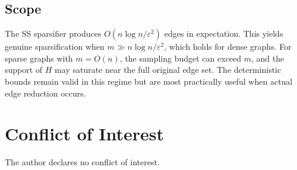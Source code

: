 \documentclass[11pt]{article}
\theoremstyle{definition}
\newcommand{\eps}{\varepsilon}
\begin{document}
\subsection{Scope}

The SS sparsifier produces $O(n\log n/\eps^2)$ edges in expectation. This yields
genuine sparsification when $m \gg n\log n/\eps^2$, which holds for dense graphs.
For sparse graphs with $m = O(n)$, the sampling budget can
exceed $m$, and the support of $H$ may saturate near the full original edge set.
The deterministic bounds remain valid in this regime but are most practically useful
when actual edge reduction occurs.



\section*{Conflict of Interest}
The author declares no conflict of interest.


\end{document}
